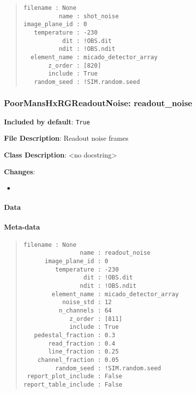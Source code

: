 \begin{quote}
\begin{alltt}
\begin{lstlisting}[frame=single]
      filename : None
          name : shot_noise
image_plane_id : 0
   temperature : -230
           dit : !OBS.dit
          ndit : !OBS.ndit
  element_name : micado_detector_array
       z_order : [820]
       include : True
   random_seed : !SIM.random.seed
\end{lstlisting}
\end{alltt}
\end{quote}


\subsubsection{PoorMansHxRGReadoutNoise: \textquotedbl{}readout\_noise\textquotedbl{}%
  \label{poormanshxrgreadoutnoise-readout-noise}%
}

\textbf{Included by default}: \texttt{True}

\textbf{File Description}: Readout noise frames

\textbf{Class Description}: <no docstring>

\textbf{Changes}:

\begin{itemize}
\item \end{itemize}


\paragraph{Data%
  \label{id13}%
}


\paragraph{Meta-data%
  \label{id14}%
}

\begin{quote}
\begin{alltt}
\begin{lstlisting}[frame=single]
            filename : None
                name : readout_noise
      image_plane_id : 0
         temperature : -230
                 dit : !OBS.dit
                ndit : !OBS.ndit
        element_name : micado_detector_array
           noise_std : 12
          n_channels : 64
             z_order : [811]
             include : True
   pedestal_fraction : 0.3
       read_fraction : 0.4
       line_fraction : 0.25
    channel_fraction : 0.05
         random_seed : !SIM.random.seed
 report_plot_include : False
report_table_include : False
\end{lstlisting}
\end{alltt}
\end{quote}
